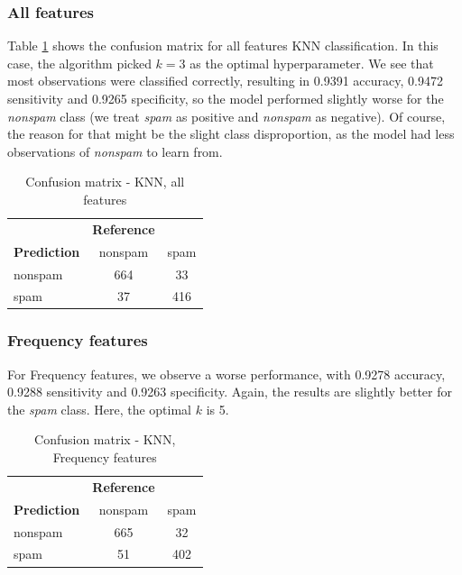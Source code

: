 \documentclass{article}\usepackage[]{graphicx}\usepackage[]{xcolor}
\begin{document}
\subsubsection*{All features}

Table \ref{KNNcm1} shows the confusion matrix for all features KNN classification.
In this case, the algorithm picked $k=3$ as the optimal hyperparameter.
We see that most observations were classified correctly, resulting in 0.9391 accuracy,
0.9472 sensitivity and 0.9265 specificity, so the model performed slightly worse for 
the \textit{nonspam} class (we treat \textit{spam} as positive and \textit{nonspam} as negative).
Of course, the reason for that might be the slight class disproportion, as the model
had less observations of \textit{nonspam} to learn from.  

\begin{table}[h]
    \centering
    \begin{tabular}{lcc}
        & \textbf{Reference} & \\
        \textbf{Prediction} & nonspam & spam \\
        nonspam & 664 & 33 \\
        spam & 37 & 416 \\
    \end{tabular}
    \caption{Confusion matrix - KNN, all features}
    \label{KNNcm1}
\end{table}

\subsubsection*{Frequency features}

For Frequency features, we observe a worse performance, with 0.9278 accuracy,
0.9288 sensitivity and 0.9263 specificity. Again, the results are slightly better 
for the \textit{spam} class. Here, the optimal $k$ is 5.

\begin{table}[h]
    \centering
    \begin{tabular}{lcc}
        & \textbf{Reference} & \\
        \textbf{Prediction} & nonspam & spam \\
        nonspam & 665 & 32 \\
        spam & 51 & 402 \\
    \end{tabular}
    \caption{Confusion matrix - KNN, Frequency features}
    \label{KNNcm2}
\end{table}
\end{document}
